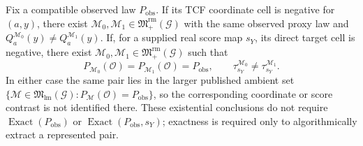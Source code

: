 Fix a compatible observed law \(P_{\mathrm{obs}}\). If its TCF coordinate cell is negative for \((a,y)\), there exist \(\mathcal M_0,\mathcal M_1\in\mathfrak M_{+}^{\mathrm{rm}}(\mathcal G)\) with the same observed proxy law and \(Q_a^{\mathcal M_0}(y)\neq Q_a^{\mathcal M_1}(y)\). If, for a supplied real score map \(s_Y\), its direct target cell is negative, there exist \(\mathcal M_0,\mathcal M_1\in\mathfrak M_{+}^{\mathrm{rm}}(\mathcal G)\) such that
\[
P_{\mathcal M_0}(\mathcal O)=P_{\mathcal M_1}(\mathcal O)=P_{\mathrm{obs}},
\qquad
\tau_{s_Y}^{\mathcal M_0}\neq\tau_{s_Y}^{\mathcal M_1}.
\]
In either case the same pair lies in the larger published ambient set \(\{\mathcal M\in\mathfrak M_{\mathrm{lm}}(\mathcal G):P_{\mathcal M}(\mathcal O)=P_{\mathrm{obs}}\}\), so the corresponding coordinate or score contrast is not identified there. These existential conclusions do not require \(\operatorname{Exact}(P_{\mathrm{obs}})\) or \(\operatorname{Exact}(P_{\mathrm{obs}},s_Y)\); exactness is required only to algorithmically extract a represented pair.